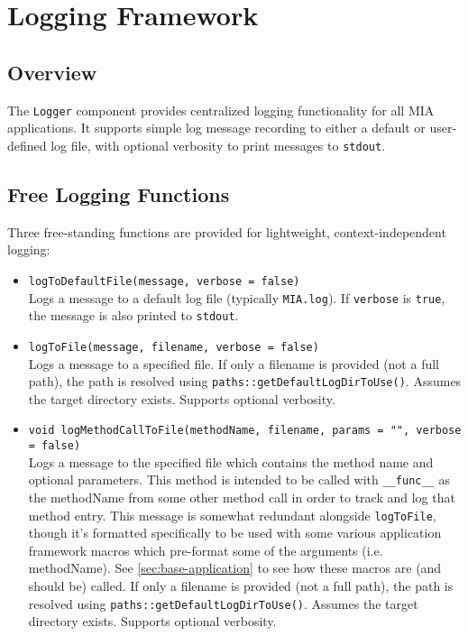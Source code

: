 \section{Logging Framework}
\label{sec:logging-Framework}

\subsection{Overview}
The \texttt{Logger} component provides centralized logging functionality for all MIA applications. It supports simple log message recording to either a default or user-defined log file, with optional verbosity to print messages to \texttt{stdout}.

\subsection{Free Logging Functions}
Three free-standing functions are provided for lightweight, context-independent logging:

\begin{itemize}
	\item \texttt{logToDefaultFile(message, verbose = false)}\\
	Logs a message to a default log file (typically \texttt{MIA.log}). If \texttt{verbose} is \texttt{true}, the message is also printed to \texttt{stdout}.
	
	\item \texttt{logToFile(message, filename, verbose = false)}\\
	Logs a message to a specified file. If only a filename is provided (not a full path), the path is resolved using \texttt{paths::getDefaultLogDirToUse()}. Assumes the target directory exists. Supports optional verbosity.

 	\item \texttt{void logMethodCallToFile(methodName, filename, params = "", verbose = false)}\\
  	Logs a message to the specified file which contains the method name and optional parameters. This method is intended to be called with \texttt{\_\_func\_\_} as the methodName from some other method call in order to track and log that method entry. This message is somewhat redundant alongside \texttt{logToFile}, though it's formatted specifically to be used with some various application framework macros which pre-format some of the arguments (i.e. methodName). See \ref{sec:base-application} to see how these macros are (and should be) called. If only a filename is provided (not a full path), the path is resolved using \texttt{paths::getDefaultLogDirToUse()}. Assumes the target directory exists. Supports optional verbosity.
\end{itemize}

